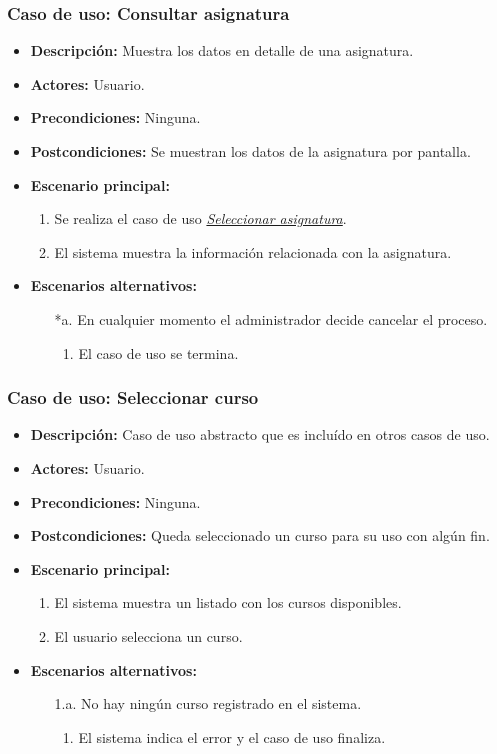 \documentclass{book}
\begin{document}
\subsubsection*{Caso de uso: Consultar asignatura}
\begin{itemize}
\item{\bf Descripción:} Muestra los datos en detalle de una asignatura.
\item{\bf Actores:} Usuario.
\item{\bf Precondiciones:} Ninguna.
\item{\bf Postcondiciones:} Se muestran los datos de la asignatura por pantalla.
\item{\bf Escenario principal:} 
	\begin{enumerate}
	\item Se realiza el caso de uso {\em \hyperref[select_asignatura]{Seleccionar asignatura}}.
	\item El sistema muestra la información relacionada con la asignatura.
	\end{enumerate}
\item{\bf Escenarios alternativos:}
	\begin{itemize}
	\item[*a.] En cualquier momento el administrador decide cancelar el proceso.
		\begin{enumerate}
		\item El caso de uso se termina.
		\end{enumerate}
	\end{itemize}
\end{itemize}

\subsubsection*{Caso de uso: Seleccionar curso}
\begin{itemize}
\item{\bf Descripción:} Caso de uso abstracto que es incluído en otros casos de uso.
\item{\bf Actores:} Usuario.
\item{\bf Precondiciones:} Ninguna.
\item{\bf Postcondiciones:} Queda seleccionado un curso para su uso con algún fin.
\item{\bf Escenario principal:}
	\begin{enumerate}
	\item El sistema muestra un listado con los cursos disponibles.
        \item El usuario selecciona un curso.
	\end{enumerate}
\item{\bf Escenarios alternativos:}
	\begin{itemize}
	\item[1.a.]No hay ningún curso registrado en el sistema.
	  \begin{enumerate}
	  \item El sistema indica el error y el caso de uso finaliza.
	  \end{enumerate}
	\end{itemize}
\end{itemize}
\end{document}
